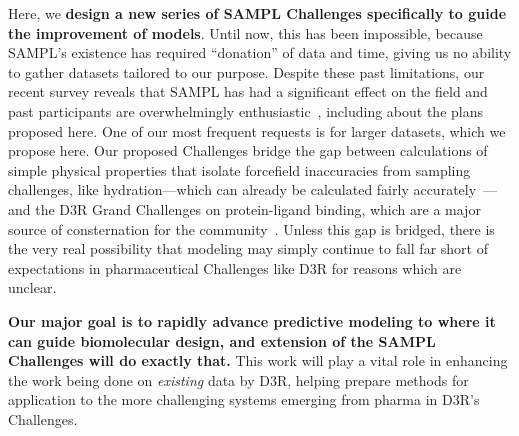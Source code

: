 \documentclass[11pt]{article}
\begin{document}
Here, we \textbf{design a new series of SAMPL Challenges specifically to guide the improvement of models}.
Until now, this has been impossible, because SAMPL's existence has required ``donation'' of data and time, giving us no ability to gather datasets tailored to our purpose. 
Despite these past limitations, our recent survey reveals that SAMPL has had a significant effect on the field and past participants are overwhelmingly enthusiastic~\cite{Mobley:2017:eScholarship}, including about the plans proposed here. 
One of our most frequent requests is for larger datasets, which we propose here. 
Our proposed Challenges bridge the gap between calculations of simple physical properties that isolate forcefield inaccuracies from sampling challenges, like hydration---which can already be calculated fairly accurately~\cite{mobley_blind_2014-1}---and the D3R Grand Challenges on protein-ligand binding, which are a major source of consternation for the community~\cite{ignjatovic_binding-affinity_2016, deng_large_2016, sunseri_d3r_2016, Gathiaka:2016:JComputAidedMolDes}.
Unless this gap is bridged, there is the very real possibility that modeling may simply continue to fall far short of expectations in pharmaceutical Challenges like D3R for reasons which are unclear.


\textbf{Our major goal is to rapidly advance predictive modeling to where it can guide biomolecular design, and extension of the SAMPL Challenges will do exactly that.} This work will play a vital role in enhancing the work being done on \emph{existing} data by D3R, helping prepare methods for application to the more challenging systems emerging from pharma in D3R's Challenges. 
\end{document}
